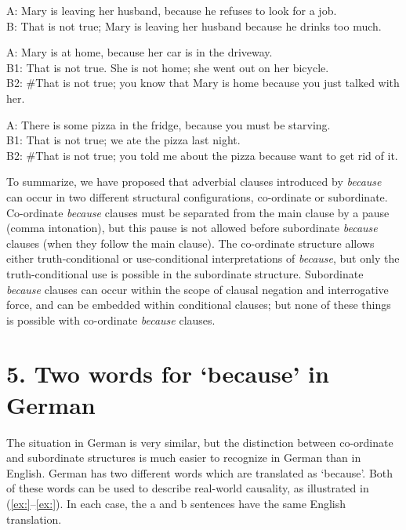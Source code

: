 \ea
A: Mary is leaving her husband, because he refuses to look for a job.\\
B: That is not true; Mary is leaving her husband because he drinks too much.
\z

\ea
A: Mary is at home, because her car is in the driveway.\\
B1: That is not true. She is not home; she went out on her bicycle.\\
B2: \#That is not true; you know that Mary is home because you just talked with her.
\z

\ea
A: There is some pizza in the fridge, because you must be starving.\\
B1: That is not true; we ate the pizza last night.\\
B2: \#That is not true; you told me about the pizza because want to get rid of it.
\z


To summarize, we have proposed that adverbial clauses introduced by \textit{because} can occur in two different structural configurations, co-ordinate or subordinate. Co-ordinate \textit{because} clauses must be separated from the main clause by a pause (comma intonation), but this pause is not allowed before subordinate \textit{because} clauses (when they follow the main clause). The co-ordinate structure allows either truth-conditional or use-conditional interpretations of \textit{because}, but only the truth-conditional use is possible in the subordinate structure. Subordinate \textit{because} clauses can occur within the scope of clausal negation and interrogative force, and can be embedded within conditional clauses; but none of these things is possible with co-ordinate \textit{because} clauses.


\section{5. Two words for ‘because’ in German}\footnotemark{}\label{sec:}

The situation in German is very similar, but the distinction between co-ordinate and subordinate structures is much easier to recognize in German than in English. German has two different words which are translated as ‘because’. Both of these words can be used to describe real-world causality, as illustrated in (\ref{ex:}--\ref{ex:}). In each case, the a and b sentences have the same English translation.


